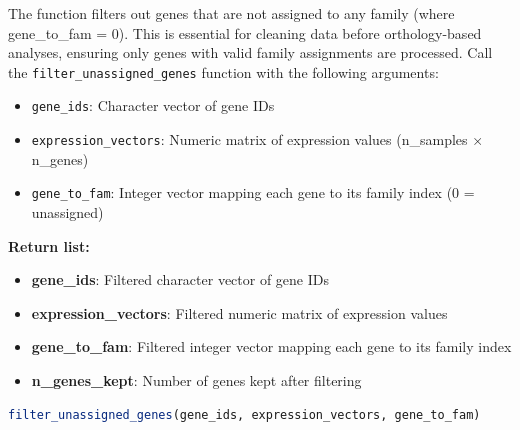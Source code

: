 \begin{enumerate}
\begin{itemize}
                  The function filters out genes that are not assigned to any family (where
                  gene\_to\_fam = 0). This is essential for cleaning data before orthology-based
                  analyses, ensuring only genes with valid family assignments are processed.
                  Call the \texttt{filter\_unassigned\_genes} function with the following arguments:
                  
                  \begin{itemize}
                    \item \texttt{gene\_ids}: Character vector of gene IDs
                          
                    \item \texttt{expression\_vectors}: Numeric matrix of expression values (n\_samples
                          × n\_genes)
                          
                    \item \texttt{gene\_to\_fam}: Integer vector mapping each gene to its family
                          index (0 = unassigned)
                  \end{itemize}
                  
                  \textbf{Return list:}
                  \begin{itemize}
                    \item \textbf{gene\_ids}: Filtered character vector of gene IDs
                          
                    \item \textbf{expression\_vectors}: Filtered numeric matrix of expression
                          values
                          
                    \item \textbf{gene\_to\_fam}: Filtered integer vector mapping each gene to
                          its family index
                          
                    \item \textbf{n\_genes\_kept}: Number of genes kept after filtering
                  \end{itemize}
                  
                  \begin{lstlisting}[language=R, caption={R Filter Unassigned Genes}]
filter_unassigned_genes(gene_ids, expression_vectors, gene_to_fam)
                  \end{lstlisting}
                  

\end{itemize}
\end{enumerate}
